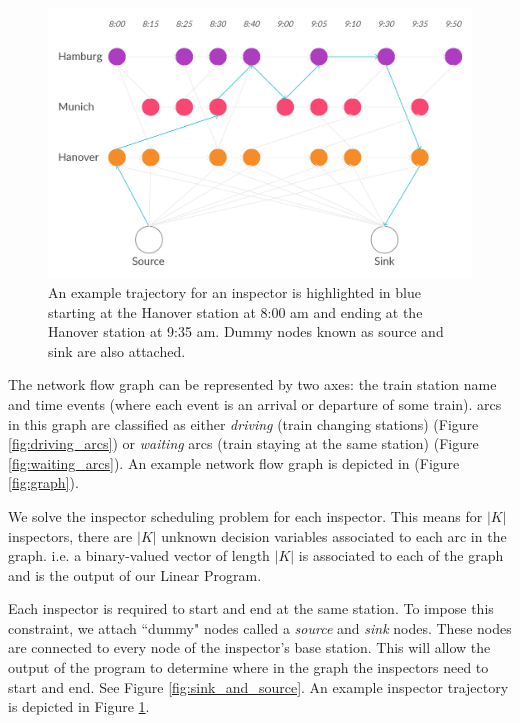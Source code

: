 \documentclass[11pt]{article}
\begin{document}
\begin{figure}
    \centering
    \includegraphics[scale=.15]{pics/Inspector_Path_Example.jpg}
    \caption{An example trajectory for an inspector is highlighted in blue starting at the Hanover station at 8:00 am and ending at the Hanover station at 9:35 am. Dummy nodes known as source and sink are also attached.}
    \label{fig:patrol_strategy}
\end{figure}
\par The network flow graph can be represented by two axes: the train station name and time events (where each event is an arrival or departure of some train). arcs in this graph are classified as either \textit{driving} (train changing stations) (Figure \ref{fig:driving_arcs}) or \textit{waiting} arcs (train staying at the same station) (Figure \ref{fig:waiting_arcs}). An example network flow graph is depicted in (Figure \ref{fig:graph}). 
\par We solve the inspector scheduling problem for each inspector. This means for $|K|$ inspectors, there are $|K|$ unknown decision variables associated to each arc in the graph. i.e. a binary-valued vector of length $|K|$ is associated to each of the graph and is the output of our Linear Program.
\par Each inspector is required to start and end at the same station. To impose this constraint, we attach ``dummy" nodes called a \textit{source} and \textit{sink} nodes. These nodes are connected to every node of the inspector's base station. This will allow the output of the program to determine where in the graph the inspectors need to start and end. See Figure \ref{fig:sink_and_source}. An example inspector trajectory is depicted in Figure \ref{fig:patrol_strategy}.
\end{document}
